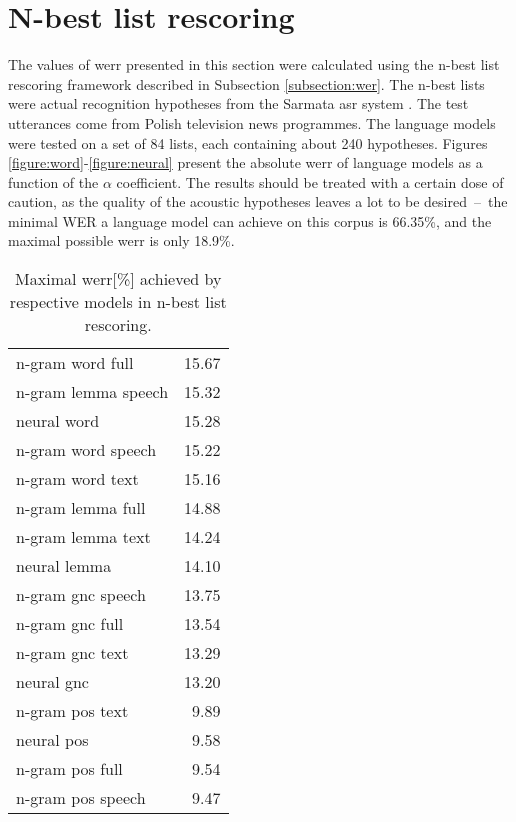 \section{N-best list rescoring}
\label{section:nbest}
The values of \gls{werr} presented in this section were calculated using the n-best list rescoring framework described in Subsection \ref{subsection:wer}. The n-best lists were actual recognition hypotheses from the Sarmata \gls{asr} system \cite{ziolko2011automatic}. The test utterances come from Polish television news programmes. The language models were tested on a set of 84 lists, each containing about 240 hypotheses. Figures \ref{figure:word}-\ref{figure:neural} present the absolute \gls{werr} of language models as a function of the $\alpha$ coefficient. The results should be treated with a certain dose of caution, as the quality of the acoustic hypotheses leaves a lot to be desired~--~the minimal WER a language model can achieve on this corpus is 66.35\%, and the maximal possible \gls{werr} is only 18.9\%.  

\begin{table}[!htbp]
	\centering
	\caption[Maximal WERR achieved by respective models in \mbox{n-best} list rescoring]{Maximal \gls{werr}[\%] achieved by respective models in n-best list rescoring.}
	\label{table:max_werr}
	\begin{tabular*}{.4\linewidth}{@{\extracolsep{\fill}}lr}
		n-gram word full    & 15.67\\
		n-gram lemma speech  & 15.32\\
		neural word   & 15.28\\
		n-gram word speech  & 15.22\\
		n-gram word text    & 15.16\\
		n-gram lemma full    & 14.88\\
		n-gram lemma text    & 14.24\\
		neural lemma  & 14.10\\
		n-gram gnc speech & 13.75\\
		n-gram gnc full   & 13.54\\
		n-gram gnc text   & 13.29\\
		neural gnc    & 13.20\\
		n-gram pos text   & 9.89\\
		neural pos    & 9.58\\
		n-gram pos full   & 9.54\\
		n-gram pos speech & 9.47\\
	\end{tabular*}
\end{table}

